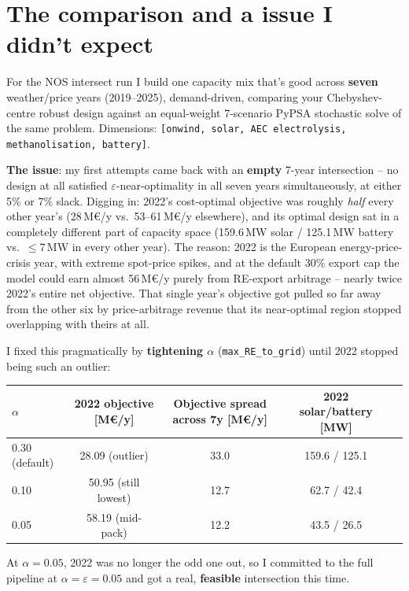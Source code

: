 \documentclass[11pt]{article}
\begin{document}
\section{The comparison and a issue I didn't expect}
\label{sec:results}
For the NOS intersect run I build one capacity mix that's good across
\textbf{seven} weather/price years (2019--2025), demand-driven, comparing
your Chebyshev-centre robust design against an equal-weight 7-scenario
PyPSA stochastic solve of the same problem. Dimensions:
\texttt{[onwind, solar, AEC electrolysis, methanolisation, battery]}.

\textbf{The issue}: my first attempts came back with an
\textbf{empty} 7-year intersection -- no design at all satisfied
$\varepsilon$-near-optimality in all seven years simultaneously, at either
5\% or 7\% slack. Digging in: 2022's cost-optimal objective was roughly
\emph{half} every other year's (28\,M€/y vs.\ 53--61\,M€/y elsewhere), and
its optimal design sat in a completely different part of capacity space
(159.6\,MW solar / 125.1\,MW battery vs.\ $\leq$7\,MW in every other year).
The reason: 2022 is the European energy-price-crisis year, with extreme
spot-price spikes, and at the default 30\% export cap the model could earn
almost 56\,M€/y purely from RE-export arbitrage -- nearly twice 2022's
entire net objective. That single year's objective got pulled so far away
from the other six by price-arbitrage revenue that its near-optimal region
stopped overlapping with theirs at all.

I fixed this pragmatically by \textbf{tightening $\alpha$}
(\texttt{max\_RE\_to\_grid}) until 2022 stopped being such an outlier:

\begin{center}
\small
\begin{tabular}{@{}lcccc@{}}
\toprule
$\alpha$ & 2022 objective [M€/y] & Objective spread across 7y [M€/y] & 2022 solar/battery [MW] \\
\midrule
0.30 (default) & 28.09 (outlier) & 33.0 & 159.6 / 125.1 \\
0.10 & 50.95 (still lowest) & 12.7 & 62.7 / 42.4 \\
0.05 & 58.19 (mid-pack) & 12.2 & 43.5 / 26.5 \\
\bottomrule
\end{tabular}
\end{center}

At $\alpha=0.05$, 2022 was no longer the odd one out, so I committed to
the full pipeline at $\alpha=\varepsilon=0.05$ and got a real,
\textbf{feasible} intersection this time.
\end{document}
